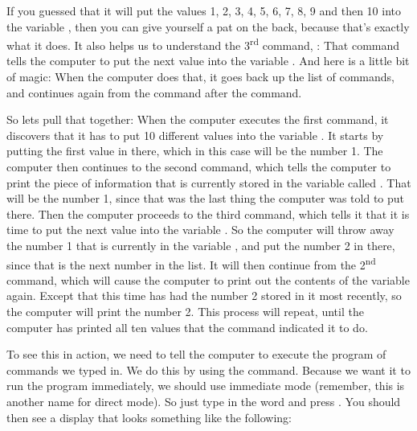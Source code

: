If you guessed
that it will put the values 1, 2, 3, 4, 5, 6, 7, 8, 9 and then 10 into the variable , then you
can give yourself a pat on the back, because that's exactly what it does.  It also helps us to
understand the 3\textsuperscript{rd} command, : That command tells the computer to put the next value into
the variable .  And here is a little bit of magic: When the computer does that, it goes back
up the list of commands, and continues again from the command after the  command.

So lets pull that together: When the computer executes the first command, it discovers that it has
to put 10 different values into the variable . It starts by putting the first value in there, which
in this case will be the number 1.
The computer then continues to the second command, which tells the computer to print the piece of
information that is currently stored in the variable called . That will be the number 1, since
that was the last thing the computer was told to put there.  Then the computer proceeds to the
third command, which tells it that it is time to put the next value into the variable .  So the
computer will throw away the number 1 that is currently in the variable , and put the number 2 in
there, since that is the next number in the list.  It will then continue from the 2\textsuperscript{nd} command,
which will cause the computer to print out the contents of the variable  again.  Except that this
time  has had the number 2 stored in it most recently, so the computer will print the number 2.
This process will repeat, until the computer has printed all ten values that the  command
indicated it to do.

\needspace{4cm} %
To see this in action, we need to tell the computer to execute the program of commands we typed in.
We do this by using the  command. Because we want it to run the program immediately, we
should use immediate mode (remember, this is another name for direct mode).
So just type in the word  and press .  You should then see a display
that looks something like the following:


